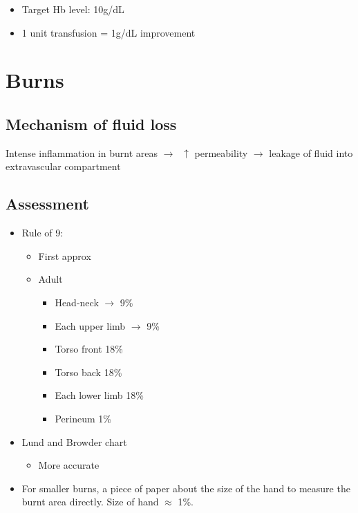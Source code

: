 \documentclass[
  14pt,
]{extarticle}
\providecommand{\tightlist}{%
  \setlength{\itemsep}{0pt}\setlength{\parskip}{0pt}}
\begin{document}
\begin{itemize}
\tightlist
\item
  Target Hb level: 10g/dL
\item
  1 unit transfusion = 1g/dL improvement
\end{itemize}

\pagebreak

\hypertarget{burns}{%
\section{Burns}\label{burns}}

\hypertarget{mechanism-of-fluid-loss}{%
\subsection{Mechanism of fluid loss}\label{mechanism-of-fluid-loss}}

Intense inflammation in burnt areas \(\rightarrow\;\;\uparrow\)
permeability \(\rightarrow\) leakage of fluid into extravascular
compartment

\hypertarget{assessment}{%
\subsection{Assessment}\label{assessment}}

\begin{itemize}
\tightlist
\item
  Rule of 9:

  \begin{itemize}
  \tightlist
  \item
    First approx
  \item
    Adult

    \begin{itemize}
    \tightlist
    \item
      Head-neck \(\rightarrow\) 9\%
    \item
      Each upper limb \(\rightarrow\) 9\%
    \item
      Torso front 18\%
    \item
      Torso back 18\%
    \item
      Each lower limb 18\%
    \item
      Perineum 1\%
    \end{itemize}
  \end{itemize}
\item
  Lund and Browder chart

  \begin{itemize}
  \tightlist
  \item
    More accurate
  \end{itemize}
\item
  For smaller burns, a piece of paper about the size of the hand to
  measure the burnt area directly. Size of hand \(\approx\) 1\%.
\end{itemize}
\end{document}
